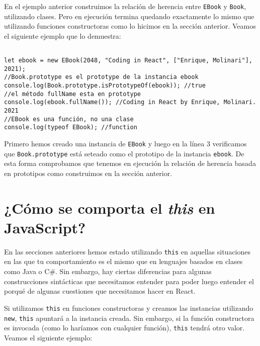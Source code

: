 \documentclass[a4paper, oneside, titlepage, 12pt]{paper}
\begin{document}
En el ejemplo anterior construimos la relación de herencia entre \texttt{EBook} y \texttt{Book}, utilizando clases. Pero en ejecución termina quedando exactamente lo mismo que utilizando funciones constructoras como lo hicimos en la sección anterior. Veamos el siguiente ejemplo que lo demuestra:

\begin{verbatim}

let ebook = new EBook(2048, "Coding in React", ["Enrique, Molinari"], 2021);
//Book.prototype es el prototype de la instancia ebook
console.log(Book.prototype.isPrototypeOf(ebook)); //true
//el método fullName esta en prototype
console.log(ebook.fullName()); //Coding in React by Enrique, Molinari. 2021
//EBook es una función, no una clase
console.log(typeof EBook); //function
\end{verbatim}

Primero hemos creado una instancia de \texttt{EBook} y luego en la línea 3 verificamos que \texttt{Book.prototype} está seteado como el prototipo de la instancia \texttt{ebook}. De esta forma comprobamos que tenemos en ejecución la relación de herencia basada en prototipos como construimos en la sección anterior.

\section{¿Cómo se comporta el \textit{this} en JavaScript?} \label{meaning_of_this}

En las secciones anteriores hemos estado utilizando \texttt{this} en aquellas situaciones en las que tu comportamiento es el mismo que en lenguajes basados en clases como Java o C\#. Sin embargo, hay ciertas diferencias para algunas construcciones sintácticas que necesitamos entender para poder luego entender el porqué de algunas cuestiones que necesitamos hacer en React.
\newline

Si utilizamos \texttt{this} en funciones constructoras y creamos las instancias utilizando \texttt{new}, \texttt{this} apuntará a la instancia creada. Sin embargo, si la función constructora es invocada (como lo haríamos con cualquier función), \texttt{this} tendrá otro valor. Veamos el siguiente ejemplo:
\end{document}
